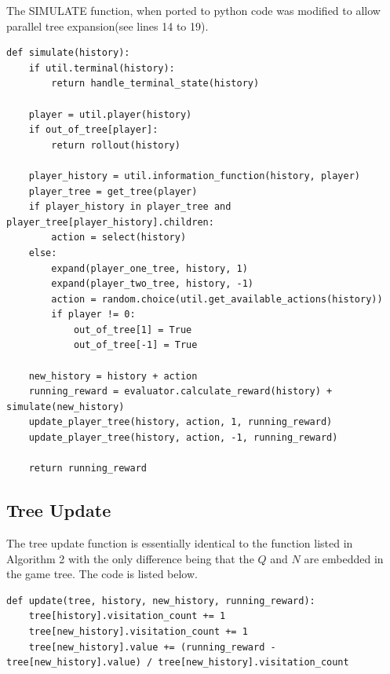 The SIMULATE function, when ported to python code was modified to allow parallel tree expansion(see lines 14 to 19).
\begin{lstlisting}[style=Python]
def simulate(history):
    if util.terminal(history):
        return handle_terminal_state(history)

    player = util.player(history)
    if out_of_tree[player]:
        return rollout(history)

    player_history = util.information_function(history, player)
    player_tree = get_tree(player)
    if player_history in player_tree and player_tree[player_history].children:
        action = select(history)
    else:
        expand(player_one_tree, history, 1)
        expand(player_two_tree, history, -1)
        action = random.choice(util.get_available_actions(history))
        if player != 0:
            out_of_tree[1] = True
            out_of_tree[-1] = True

    new_history = history + action
    running_reward = evaluator.calculate_reward(history) + simulate(new_history)
    update_player_tree(history, action, 1, running_reward)
    update_player_tree(history, action, -1, running_reward)

    return running_reward
\end{lstlisting}


\subsection{Tree Update}\label{subsec:treeUpdate}
The tree update function is essentially identical to the function listed in Algorithm 2 with
the only difference being that the $Q$ and $N$ are embedded in the game tree.
The code is listed below.

\begin{lstlisting}[style=Python]
def update(tree, history, new_history, running_reward):
    tree[history].visitation_count += 1
    tree[new_history].visitation_count += 1
    tree[new_history].value += (running_reward - tree[new_history].value) / tree[new_history].visitation_count
\end{lstlisting}



